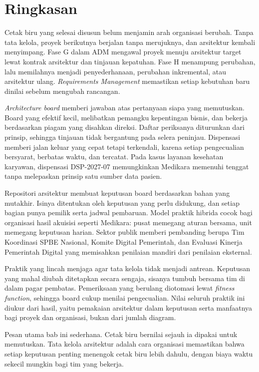\section{Ringkasan}

Cetak biru yang selesai disusun belum menjamin arah organisasi berubah.
Tanpa tata kelola, proyek berikutnya berjalan tanpa merujuknya, dan
arsitektur kembali menyimpang. Fase G dalam ADM mengawal proyek menuju
arsitektur target lewat kontrak arsitektur dan tinjauan kepatuhan. Fase H
menampung perubahan, lalu memilahnya menjadi penyederhanaan, perubahan
inkremental, atau arsitektur ulang. \textit{Requirements Management}
memastikan setiap kebutuhan baru dinilai sebelum mengubah rancangan.

\textit{Architecture board} memberi jawaban atas pertanyaan siapa yang
memutuskan. Board yang efektif kecil, melibatkan pemangku kepentingan
bisnis, dan bekerja berdasarkan piagam yang disahkan direksi. Daftar
periksanya diturunkan dari prinsip, sehingga tinjauan tidak bergantung pada
selera peninjau. Dispensasi memberi jalan keluar yang cepat tetapi
terkendali, karena setiap pengecualian bersyarat, berbatas waktu, dan
tercatat. Pada kasus layanan kesehatan karyawan, dispensasi DSP-2027-07
memungkinkan Medikara memenuhi tenggat tanpa melepaskan prinsip satu sumber
data pasien.

Repositori arsitektur membuat keputusan board berdasarkan bahan yang
mutakhir. Isinya ditentukan oleh keputusan yang perlu didukung, dan setiap
bagian punya pemilik serta jadwal pembaruan. Model praktik hibrida cocok
bagi organisasi hasil akuisisi seperti Medikara: pusat memegang aturan
bersama, unit memegang keputusan harian. Sektor publik memberi pembanding
berupa Tim Koordinasi SPBE Nasional, Komite Digital Pemerintah, dan
Evaluasi Kinerja Pemerintah Digital yang memisahkan penilaian mandiri dari
penilaian eksternal.

Praktik yang lincah menjaga agar tata kelola tidak menjadi antrean.
Keputusan yang mahal diubah ditetapkan secara sengaja, sisanya tumbuh
bersama tim di dalam pagar pembatas. Pemeriksaan yang berulang diotomasi
lewat \textit{fitness function}, sehingga board cukup menilai pengecualian.
Nilai seluruh praktik ini diukur dari hasil, yaitu pemakaian arsitektur
dalam keputusan serta manfaatnya bagi proyek dan organisasi, bukan dari
jumlah diagram.

Pesan utama bab ini sederhana. Cetak biru bernilai sejauh ia dipakai untuk
memutuskan. Tata kelola arsitektur adalah cara organisasi memastikan bahwa
setiap keputusan penting menengok cetak biru lebih dahulu, dengan biaya
waktu sekecil mungkin bagi tim yang bekerja.

